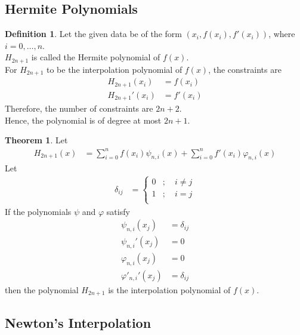 \documentclass[fleqn, a4paper, 12pt, twoside, titlepage]{article}
\theoremstyle{definition}
\newtheorem{definition}{Definition}
\theoremstyle{theorem}
\newtheorem{theorem}{Theorem}
\begin{document}
\subsection{Hermite Polynomials}

\begin{definition}
	Let the given data be of the form $\left( x_i , f(x_i) , f'(x_i) \right)$, where $i = 0,\dots,n$.\\
	$H_{2 n + 1}$ is called the Hermite polynomial of $f(x)$.\\
	For $H_{2 n + 1}$ to be the interpolation polynomial of $f(x)$, the constraints are
	\begin{align*}
		H_{2 n + 1}(x_i)  & = f(x_i) \\
		H_{2 n + 1}'(x_i) & = f'(x_i)
	\end{align*}
	Therefore, the number of constraints are $2 n + 2$.\\
	Hence, the polynomial is of degree at most $2 n + 1$.\\
\end{definition}

\begin{theorem}
	Let
	\begin{align*}
		H_{2 n + 1}(x) & = \sum\limits_{i = 0}^{n} f(x_i) \psi_{n,i}(x) + \sum\limits_{i = 0}^{n} f'(x_i) \varphi_{n,i}(x)
	\end{align*}
	Let
	\begin{align*}
		\delta_{i j} &=
			\begin{cases}
				0 & ;\quad i \neq j \\
				1 & ;\quad i = j    \\
			\end{cases}
	\end{align*}
	If the polynomials $\psi$ and $\varphi$ satisfy
	\begin{align*}
		\psi_{n,i}(x_j)        & = \delta_{i j} \\
		{\psi_{n,i}}'(x_j)     & = 0            \\
		\varphi_{n,i}(x_j)     & = 0            \\
		{\varphi'_{n,i}}'(x_j) & = \delta_{i j}
	\end{align*}
	then the polynomial $H_{2 n + 1}$ is the interpolation polynomial of $f(x)$.
\end{theorem}

\subsection{Newton's Interpolation}
\end{document}
